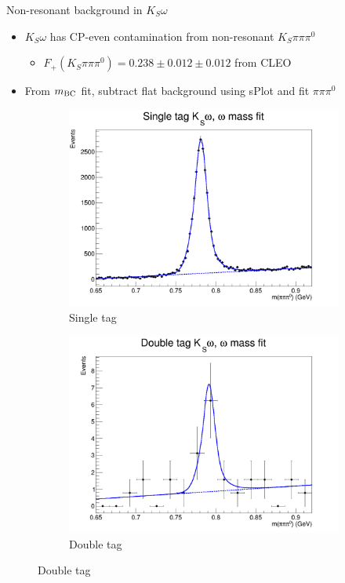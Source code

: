 \documentclass{beamer}
\begin{document}
\begin{frame}{Non-resonant background in $K_S\omega$}
  \begin{itemize}
    \setlength\itemsep{0.5em}
    \item{$K_S\omega$ has CP-even contamination from non-resonant $K_S\pi\pi\pi^0$}
    \begin{itemize}
      \item{$F_+(K_S\pi\pi\pi^0) = 0.238\pm0.012\pm0.012$ from CLEO}
    \end{itemize}
    \item{From $m_{\rm BC}$ fit, subtract flat background using sPlot and fit $\pi\pi\pi^0$}
  \end{itemize}
  \begin{figure}
    \centering
    \begin{subfigure}{0.5\textwidth}
      \centering
      \includegraphics[width=1.0\textwidth]{Plots/KSomega_ST_Mpipipi0.png}
      \caption{Single tag}
    \end{subfigure}%
    \begin{subfigure}{0.5\textwidth}
      \centering
      \includegraphics[width=1.0\textwidth]{Plots/KSomega_DT_Mpipipi0.png}
      \caption{Double tag}
    \end{subfigure}
  \end{figure}
\end{frame}
\end{document}
